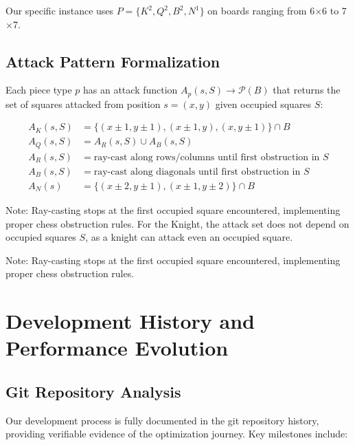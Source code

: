 \documentclass[12pt,a4paper]{article}
\theoremstyle{definition}
\begin{document}
Our specific instance uses $P = \{K^2, Q^2, B^2, N^1\}$ on boards ranging from 6$\times$6 to 7$\times$7.

\subsection{Attack Pattern Formalization}

Each piece type $p$ has an attack function $A_p(s, S) \rightarrow \mathcal{P}(B)$ that returns the set of squares attacked from position $s=(x,y)$ given occupied squares $S$:

\begin{align}
A_K(s, S) &= \{(x \pm 1, y \pm 1), (x \pm 1, y), (x, y \pm 1)\} \cap B \\
A_Q(s, S) &= A_R(s, S) \cup A_B(s, S) \\
A_R(s, S) &= \text{ray-cast along rows/columns until first obstruction in } S \\
A_B(s, S) &= \text{ray-cast along diagonals until first obstruction in } S \\
A_N(s) &= \{(x \pm 2, y \pm 1), (x \pm 1, y \pm 2)\} \cap B
\end{align}

Note: Ray-casting stops at the first occupied square encountered, implementing proper chess obstruction rules. For the Knight, the attack set does not depend on occupied squares $S$, as a knight can attack even an occupied square.

Note: Ray-casting stops at the first occupied square encountered, implementing proper chess obstruction rules.

\section{Development History and Performance Evolution}

\subsection{Git Repository Analysis}

Our development process is fully documented in the git repository history, providing verifiable evidence of the optimization journey. Key milestones include:
\end{document}
